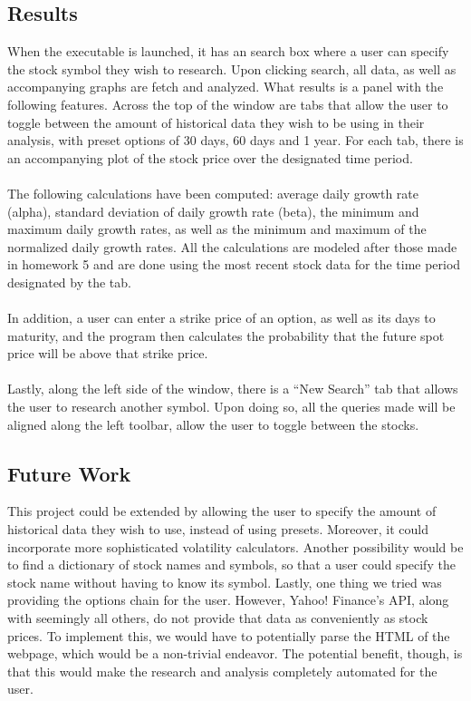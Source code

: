 \documentclass[pdftex,12pt]{article}
\theoremstyle{definition}
\theoremstyle{remark}
\begin{document}
\subsection*{Results}
When the executable is launched, it has an search box where a user can specify the stock symbol they wish to research. Upon clicking search, all data, as well as accompanying graphs are fetch and analyzed. What results is a panel with the following features. Across the top of the window are tabs that allow the user to toggle between the amount of historical data they wish to be using in their analysis, with preset options of 30 days, 60 days and 1 year. For each tab, there is an accompanying plot of the stock price over the designated time period. \\ \\
The following calculations have been computed: average daily growth rate (alpha), standard deviation of daily growth rate (beta), the minimum and maximum daily growth rates, as well as the minimum and maximum of the normalized daily growth rates. All the calculations are modeled after those made in homework 5 and are done using the most recent stock data for the time period designated by the tab.\\ \\
In addition, a user can enter a strike price of an option, as well as its days to maturity, and the program then calculates the probability that the future spot price will be above that strike price.\\ \\
Lastly, along the left side of the window, there is a ``New Search'' tab that allows the user to research another symbol. Upon doing so, all the queries made will be aligned along the left toolbar, allow the user to toggle between the stocks.
\subsection*{Future Work}
This project could be extended by allowing the user to specify the amount of historical data they wish to use, instead of using presets. Moreover, it could incorporate more sophisticated volatility calculators. Another possibility would be to find a dictionary of stock names and symbols, so that a user could specify the stock name without having to know its symbol. Lastly, one thing we tried was providing the options chain for the user. However, Yahoo! Finance's API, along with seemingly all others, do not provide that data as conveniently as stock prices. To implement this, we would have to potentially parse the HTML of the webpage, which would be a non-trivial endeavor. The potential benefit, though, is that this would make the research and analysis completely automated for the user.
\end{document}

